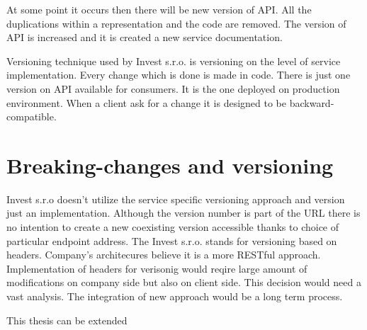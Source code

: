At some point it occurs then there will be new version of API. All the duplications within a representation and the code are removed. The version of API is increased and it is created a new service documentation.

Versioning technique used by Invest s.r.o. is versioning on the level of service implementation. Every change which is done is made in code. There is just one version on API available for consumers. It is the one deployed on production environment. When a client ask for a change it is designed to be backward-compatible.


\section{Breaking-changes and versioning}
Invest s.r.o doesn't utilize the service specific versioning approach and version just an implementation. Although the version number is part of the URL there is no intention to create a new coexisting version accessible thanks to choice of particular endpoint address.
The Invest s.r.o. stands for versioning based on headers. Company's architecures believe it is a more RESTful approach. Implementation of headers for verisonig would reqire large amount of modifications on company side but also on client side. This decision would need a vast analysis. The integration of new approach would be a long term process. 

This thesis can be extended



%












